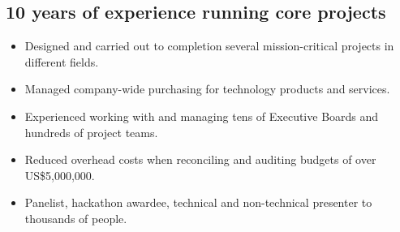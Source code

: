 \documentclass[]{deedy-resume-openfont}
\begin{document}
\subsection{10 years of experience running core projects}
\vspace{\topsep}
\begin{itemize} 
    \item Designed and carried out to completion several mission-critical projects in different fields.
    \item Managed company-wide purchasing for technology products and services.
    \item Experienced working with and managing tens of Executive Boards and hundreds of project teams.
    \item Reduced overhead costs when reconciling and auditing budgets of over US\$5,000,000.
    \item Panelist, hackathon awardee, technical and non-technical presenter to thousands of people.
	\end{itemize}
\end{document}
